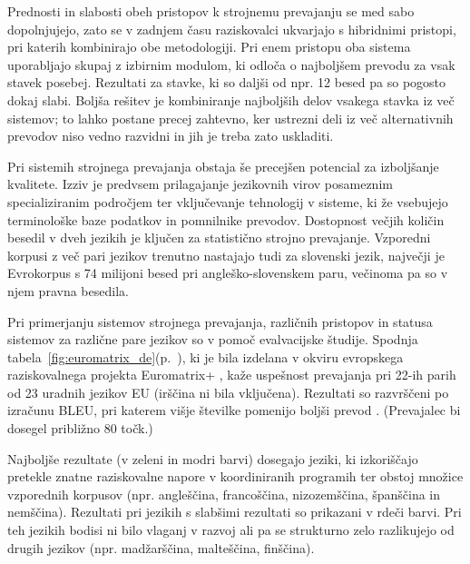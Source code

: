 \begin{multicols}{2}
Prednosti in slabosti obeh pristopov k strojnemu prevajanju se med sabo dopolnjujejo, zato se v zadnjem času raziskovalci ukvarjajo s hibridnimi pristopi, pri katerih kombinirajo obe metodologiji. Pri enem pristopu oba sistema uporabljajo skupaj z izbirnim modulom, ki odloča o najboljšem prevodu za vsak stavek posebej. Rezultati za stavke, ki so daljši od npr. 12 besed pa so pogosto dokaj slabi. Boljša rešitev je kombiniranje najboljših delov vsakega stavka iz več sistemov; to lahko postane precej zah\-tevno, ker ustrezni deli iz več alternativnih prevodov niso vedno razvidni in jih je treba zato uskladiti.

Pri sistemih strojnega prevajanja obstaja še precejšen potencial za izboljšanje kvalitete. Izziv je predvsem prilagajanje jezikovnih virov posameznim specializiranim področjem ter vključevanje tehnologij v sisteme, ki že vsebujejo terminološke baze podatkov in pomnilnike prevodov. Dostopnost večjih količin besedil v dveh jezikih je ključen za statistično strojno prevajanje. Vzporedni korpusi z več pari jezikov trenutno nastajajo tudi za slovenski jezik, največji je Evrokorpus s 74 milijoni besed pri angleško-slovenskem paru, večinoma pa so v njem pravna besedila.

Pri primerjanju sistemov strojnega prevajanja, različnih pristopov in statusa sistemov za različne pare jezikov so v pomoč evalvacijske študije. Spodnja tabela~\ref{fig:euromatrix_de}(p.~\pageref{fig:euromatrix_de}), ki je bila izdelana v okviru evropskega raziskovalnega projekta Euromatrix+ \cite{euro1}, kaže uspešnost prevajanja pri 22-ih parih od 23 uradnih jezikov EU (irščina ni bila vključena). Rezultati so razvrščeni po izračunu BLEU, pri katerem višje številke pomenijo boljši prevod \cite{bleu1}.  (Prevajalec bi dosegel približno 80 točk.) 

Najboljše rezultate (v zeleni in modri barvi) dosegajo jeziki, ki izkoriščajo pretekle znatne raziskovalne napore v koordiniranih programih ter obstoj množice vzporednih korpusov (npr. angleščina, francoščina, nizozemščina, španščina in nemščina). Rezultati pri jezikih s slabšimi rezultati so prikazani v rdeči barvi. Pri teh jezikih bodisi ni bilo vlaganj v razvoj ali pa se strukturno zelo razlikujejo od drugih jezikov (npr. madžarščina, malteščina, finščina).


\end{multicols}
